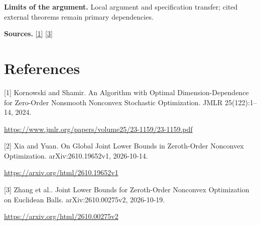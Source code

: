\documentclass[10pt,a4paper]{article}
\begin{document}
\textbf{Limits of the argument.} Local argument and specification transfer; cited external theorems remain primary dependencies.

\textbf{Sources.} \href{https://www.jmlr.org/papers/volume25/23-1159/23-1159.pdf}{[1]} \href{https://arxiv.org/html/2610.00275v2}{[3]}

\section{References}
[1] Kornowski and Shamir. An Algorithm with Optimal Dimension-Dependence for Zero-Order Nonsmooth Nonconvex Stochastic Optimization. JMLR 25(122):1--14, 2024.

\url{https://www.jmlr.org/papers/volume25/23-1159/23-1159.pdf}

[2] Xia and Yuan. On Global Joint Lower Bounds in Zeroth-Order Nonconvex Optimization. arXiv:2610.19652v1, 2026-10-14.

\url{https://arxiv.org/html/2610.19652v1}

[3] Zhang et al.. Joint Lower Bounds for Zeroth-Order Nonconvex Optimization on Euclidean Balls. arXiv:2610.00275v2, 2026-10-19.

\url{https://arxiv.org/html/2610.00275v2}
\end{document}

